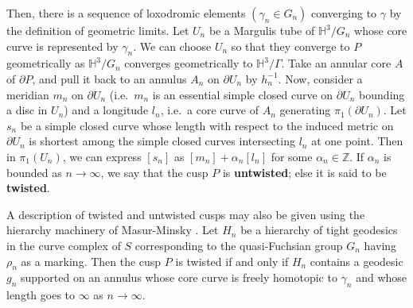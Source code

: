 \documentclass{amsart}
\theoremstyle{definition}
\newcommand{\reals}{\mathbb{R}}
\newcommand{\integers}{\mathbb{Z}}
\newcommand{\ie}{i.e.\ }
\newcommand\HHH{{\mathbb H}}
\begin{document}
Then, there is a sequence of loxodromic elements $(\gamma_n \in G_n)$ converging to $\gamma$ by the definition of geometric limits.
Let $U_n$ be a Margulis tube of $\HHH^3/G_n$ whose core curve is represented by $\gamma_n$.
We can choose  $U_n$ so that they converge to $P$ geometrically as  $\HHH^3/G_n$ converges geometrically to $\HHH^3/\Gamma$.
Take an  annular core $A$ of $\partial P$, and pull it back
to an annulus $A_n$ on $\partial U_n$ by $h_n^{-1}$. 
Now, consider a meridian
$m_n$  on $\partial U_n$ (\ie $m_n$ is an essential simple closed curve on $\partial U_n$ bounding a disc in $U_n$)   and a longitude $l_n$, \ie a core curve of $A_n$  generating  $\pi_1(\partial U_n)$.
Let $s_n$ be a simple closed curve  whose length  with respect to  the induced metric on $\partial U_n$ is shortest among the simple closed curves intersecting $l_n$ at one point.
Then in $\pi_1(U_n)$, we can express $[s_n]$ as $[m_n]+ \alpha_n [l_n]$ for some $\alpha_n \in \integers$.
If $\alpha_n$ is bounded as $n \rightarrow \infty$, we say that the cusp $P$ is  {\bf untwisted};  else it is said to be {\bf twisted}.

A description of twisted and untwisted cusps may also be given  using the hierarchy machinery of  Masur-Minsky \cite{masur-minsky2}.
Let $H_n$ be a hierarchy of tight geodesics in the curve complex of $S$ corresponding to the quasi-Fuchsian group $G_n$ having $\rho_n$ as a marking.
Then the cusp $P$ is twisted  if and only if $H_n$ contains a geodesic $g_n$ supported on an annulus whose core curve is freely homotopic to $\gamma_n$ and whose length goes to $\infty$ as $n \rightarrow \infty$.\\



%
\end{document}
